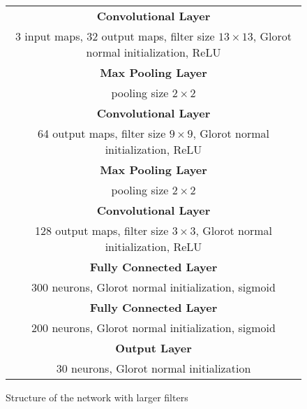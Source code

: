 \begin{figure}[h!]
	\scriptsize
	\centering
	\begin{tabular}{|c|}
	\hline
		\textbf{Convolutional Layer}\\
		3 input maps, 32 output maps, filter size $13\times13$, Glorot normal initialization, \ac{ReLU}\\
	\hline
		\textbf{Max Pooling Layer}\\
		pooling size $2\times2$\\
	\hline
		\textbf{Convolutional Layer}\\
		64 output maps, filter size $9\times9$, Glorot normal initialization, \ac{ReLU}\\
	\hline
		\textbf{Max Pooling Layer}\\
		pooling size $2\times2$\\
	\hline
		\textbf{Convolutional Layer}\\
		128 output maps, filter size $3\times3$, Glorot normal initialization, \ac{ReLU}\\
	\hline
		\textbf{Fully Connected Layer}\\
		300 neurons, Glorot normal initialization, sigmoid\\
	\hline
		\textbf{Fully Connected Layer}\\
		200 neurons, Glorot normal initialization, sigmoid\\
	\hline
		\textbf{Output Layer}\\
		30 neurons, Glorot normal initialization\\
	\hline
	\end{tabular}
	\caption{Structure of the  network with larger filters}
	\label{fig:structure_of_the_largerfilters_network}
\end{figure}
